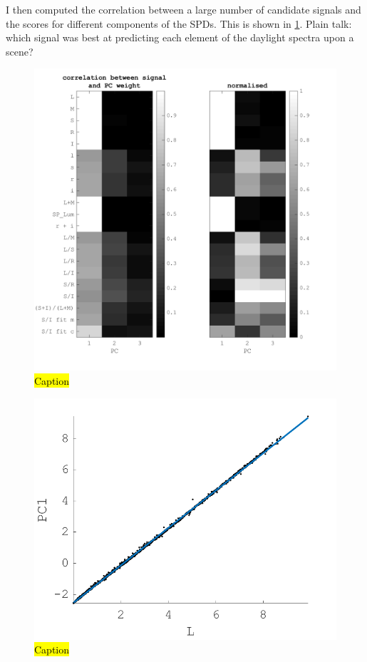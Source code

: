 
I then computed the correlation between a large number of candidate signals and the scores for different components of the \glspl{SPD}. This is shown in \ref{fig:19}. Plain talk: which signal was best at predicting each element of the daylight spectra upon a scene?

\begin{figure}[htbp]
 \includegraphics[max width=\textwidth]{figs/comp/melcomp_3/19.png}
 \caption{\hl{Caption}}
 \label{fig:19}
\end{figure} 

\begin{figure}[htbp]
 \includegraphics[max width=\textwidth]{figs/comp/melcomp_3/20.png}
 \caption{\hl{Caption}}
 \label{fig:L-PC1}
\end{figure} 

